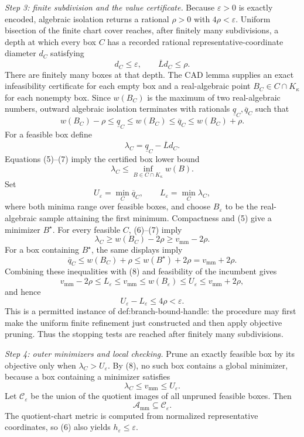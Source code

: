 \emph{Step 3: finite subdivision and the value certificate.}
Because \(\varepsilon>0\) is exactly encoded, algebraic isolation returns a rational \(\rho>0\) with \(4\rho<\varepsilon\).  Uniform bisection of the finite chart cover reaches, after finitely many subdivisions, a depth at which every box \(C\) has a recorded rational representative-coordinate diameter \(d_C\) satisfying
\[
d_C\le\varepsilon,
\qquad \overline Ld_C\le\rho. \tag{6}
\]
There are finitely many boxes at that depth.  The CAD lemma supplies an exact infeasibility certificate for each empty box and a real-algebraic point \(B_C\in C\cap K_\kappa\) for each nonempty box.  Since \(w(B_C)\) is the maximum of two real-algebraic numbers, outward algebraic isolation terminates with rationals \(\underline q_C,\overline q_C\) such that
\[
w(B_C)-\rho\le\underline q_C\le w(B_C)
\le\overline q_C\le w(B_C)+\rho. \tag{7}
\]
For a feasible box define
\[
\lambda_C=\underline q_C-\overline Ld_C.
\]
Equations (5)--(7) imply the certified box lower bound
\[
\lambda_C\le\inf_{B\in C\cap K_\kappa}w(B). \tag{8}
\]
Set
\[
U_\varepsilon=\min_C\overline q_C,
\qquad L_\varepsilon=\min_C\lambda_C,
\]
where both minima range over feasible boxes, and choose \(B_\varepsilon\) to be the real-algebraic sample attaining the first minimum.  Compactness and (5) give a minimizer \(B^\star\).  For every feasible \(C\), (6)--(7) imply
\[
\lambda_C\ge w(B_C)-2\rho\ge v_{\mathrm{mm}}-2\rho.
\]
For a box containing \(B^\star\), the same displays imply
\[
\overline q_C\le w(B_C)+\rho
\le w(B^\star)+2\rho=v_{\mathrm{mm}}+2\rho.
\]
Combining these inequalities with (8) and feasibility of the incumbent gives
\[
v_{\mathrm{mm}}-2\rho
\le L_\varepsilon\le v_{\mathrm{mm}}
\le w(B_\varepsilon)\le U_\varepsilon
\le v_{\mathrm{mm}}+2\rho,
\]
and hence
\[
U_\varepsilon-L_\varepsilon\le4\rho<\varepsilon. \tag{9}
\]
This is a permitted instance of def:branch-bound-handle: the procedure may first make the uniform finite refinement just constructed and then apply objective pruning.  Thus the stopping tests are reached after finitely many subdivisions.

\emph{Step 4: outer minimizers and local checking.}
Prune an exactly feasible box by its objective only when \(\lambda_C>U_\varepsilon\).  By (8), no such box contains a global minimizer, because a box containing a minimizer satisfies
\[
\lambda_C\le v_{\mathrm{mm}}\le U_\varepsilon.
\]
Let \(\mathcal C_\varepsilon\) be the union of the quotient images of all unpruned feasible boxes.  Then
\[
\mathcal A_{\mathrm{mm}}\subseteq\mathcal C_\varepsilon.
\]
The quotient-chart metric is computed from normalized representative coordinates, so (6) also yields \(h_\varepsilon\le\varepsilon\).

